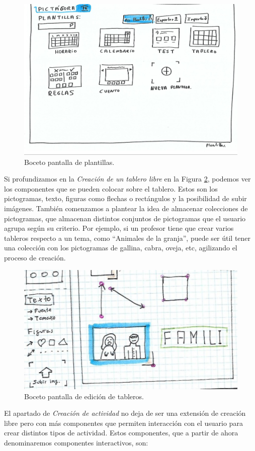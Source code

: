 \begin{figure}[h!]
	\centering
	\includegraphics[width=0.7\linewidth]{Imagenes/Bitmap/inicioAlfonso}
	\caption{Boceto pantalla de plantillas.}
	\label{fig:inicioalfonso}
\end{figure}


 Si profundizamos en la \textit{Creación de un tablero libre} en la Figura \ref{fig:dibujolibrealfon}, podemos ver los componentes que se pueden colocar sobre el tablero. Estos son los pictogramas, texto, figuras como flechas o rectángulos y la posibilidad de subir imágenes. También comenzamos a plantear la idea de almacenar colecciones de pictogramas, que almacenan distintos conjuntos de pictogramas que el usuario agrupa según su criterio. Por ejemplo, si un profesor tiene que crear varios tableros respecto a un tema, como “Animales de la granja”, puede ser útil tener una colección con los pictogramas de gallina, cabra, oveja, etc, agilizando el proceso de creación.

\begin{figure}[h!]
	\centering
	\includegraphics[width=0.7\linewidth]{Imagenes/Bitmap/DibujoLibreAlfon}
	\caption{Boceto pantalla de edición de tableros.}
	\label{fig:dibujolibrealfon}
\end{figure}

El apartado de \textit{Creación de actividad} no deja de ser una extensión de creación libre pero con más componentes que permiten interacción con el usuario para crear distintos tipos de actividad. Estos componentes, que a partir de ahora denominaremos componentes interactivos, son:

